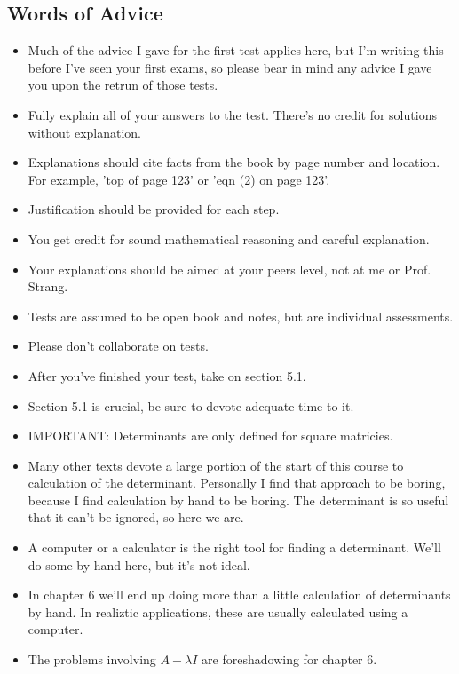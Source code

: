 	\subsection{Words of Advice}
		\begin{itemize}
			\item Much of the advice I gave for the first test applies here, but I'm writing this before I've seen your first exams, so please bear in mind any advice I gave you upon the retrun of those tests.
			\item Fully explain all of your answers to the test. There's no credit for solutions without explanation.
			\item Explanations should cite facts from the book by page number and location. For example, 'top of page 123' or 'eqn (2) on page 123'.
			\item Justification should be provided for each step.
			\item You get credit for sound mathematical reasoning and careful explanation.
			\item Your explanations should be aimed at your peers level, not at me or Prof. Strang.
			\item Tests are assumed to be open book and notes, but are individual assessments.
			\item Please don't collaborate on tests.
			\item After you've finished your test, take on section 5.1.
			\item Section 5.1 is crucial, be sure to devote adequate time to it.
			\item IMPORTANT: Determinants are only defined for square matricies.
			\item Many other texts devote a large portion of the start of this course to calculation of the determinant. Personally I find that approach to be boring, because I find calculation by hand to be boring. The determinant is so useful that it can't be ignored, so here we are.
			\item A computer or a calculator is the right tool for finding a determinant. We'll do some by hand here, but it's not ideal.
			\item In chapter 6 we'll end up doing more than a little calculation of determinants by hand. In realiztic applications, these are usually calculated using a computer.
			\item The problems involving $A-\lambda I$ are foreshadowing for chapter 6.
		\end{itemize}

